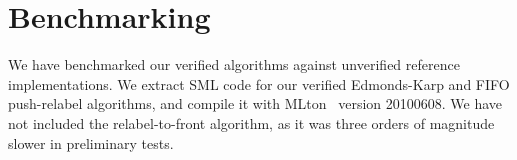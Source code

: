 \documentclass[smallcondensed]{svjour3}     %
\newcommand{\isai}{\lstinline[language=isabelle,basicstyle=\normalsize\ttfamily\slshape]}
\begin{document}
\begin{comment}
We use the previous results to complete the proof of the first step. It is easy
to see that \isai{init-preflow} and \isa{init-labeling} produce a valid preflow
as well as a valid height labeling function. We have also shown the maintanance
of these properties earlier. When the algorithm terminates, the excess value
$e(v)$ of each node $v \in V$ is equal to $0$. So, the preflow that was
maintained during the execution becomes a valid flow. Given the fact that the
height labeling assumptions are also maintained and using the latest auxillary
lemma, we can conclude that there is no path from source to sink in the residual
graph. Hence, the result of the algorithm is a maximum flow using the
Ford-fulkerson theorem.

\texttt{\\\\---Discuss termination proofs if required}

\texttt{\\\\---Discuss our time complexity proof, if required}

\texttt{\\\\---talk about relabel-to-front and fifo instances}

\end{comment}
  
\section{Benchmarking}\label{sec:benchmark}
  We have benchmarked our verified algorithms against unverified reference implementations.
  We extract SML code for our verified Edmonds-Karp and FIFO push-relabel algorithms, and compile it with MLton~\cite{MLton} version 20100608.
  We have not included the relabel-to-front algorithm, as it was three orders of magnitude slower in preliminary tests.
\end{document}
